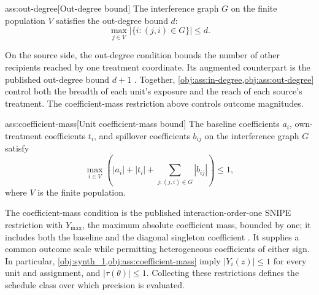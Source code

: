\documentclass[11pt]{article}
\begin{document}
\begin{assumptionv}{ass:out-degree}[Out-degree bound]
The interference graph \(G\) on the finite population \(V\) satisfies the out-degree bound \(d\):
\[
\max_{j\in V}\bigl|\{i:(j,i)\in G\}\bigr|\le d.
\]
\end{assumptionv}

On the source side, the out-degree condition bounds the number of other recipients reached by one treatment coordinate. Its augmented counterpart is the published out-degree bound \(d+1\) \citep{CortezRodriguezEichhornYu2023SNIPE}. Together, \cref{obj:ass:in-degree,obj:ass:out-degree} control both the breadth of each unit's exposure and the reach of each source's treatment. The coefficient-mass restriction above controls outcome magnitudes.

\begin{assumptionv}{ass:coefficient-mass}[Unit coefficient-mass bound]
The baseline coefficients \(a_i\), own-treatment coefficients \(t_i\), and spillover coefficients \(b_{ij}\) on the interference graph \(G\) satisfy
\[
\max_{i\in V}
\left(
|a_i|+|t_i|+\sum_{j:(j,i)\in G}|b_{ij}|
\right)\le 1,
\]
where \(V\) is the finite population.
\end{assumptionv}

The coefficient-mass condition is the published interaction-order-one SNIPE restriction with \(Y_{\max}\), the maximum absolute coefficient mass, bounded by one; it includes both the baseline and the diagonal singleton coefficient \citep{CortezRodriguezEichhornYu2023SNIPE}. It supplies a common outcome scale while permitting heterogeneous coefficients of either sign. In particular, \cref{obj:synth_1,obj:ass:coefficient-mass} imply \(|Y_i(z)|\le1\) for every unit and assignment, and \(|\tau(\theta)|\le1\). Collecting these restrictions defines the schedule class over which precision is evaluated.
\end{document}
